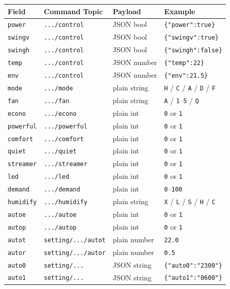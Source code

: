 \documentclass[11pt,a4paper]{article}
\newcommand{\topic}[1]{\texttt{\color{accent}#1}}
\newcommand{\field}[1]{\texttt{\color{codegreen}#1}}
\begin{document}
\begin{longtable}{@{}llll@{}}
\toprule
\textbf{Field} & \textbf{Command Topic} & \textbf{Payload} & \textbf{Example} \\
\midrule
\endhead
\rowcolor{lightbg}
\field{power}    & \topic{.../control}  & JSON bool   & \texttt{\{"power":true\}} \\
\field{swingv}   & \topic{.../control}  & JSON bool   & \texttt{\{"swingv":true\}} \\
\rowcolor{lightbg}
\field{swingh}   & \topic{.../control}  & JSON bool   & \texttt{\{"swingh":false\}} \\
\field{temp}     & \topic{.../control}  & JSON number & \texttt{\{"temp":22\}} \\
\rowcolor{lightbg}
\field{env}      & \topic{.../control}  & JSON number & \texttt{\{"env":21.5\}} \\
\field{mode}     & \topic{.../mode}     & plain string & \texttt{H} / \texttt{C} / \texttt{A} / \texttt{D} / \texttt{F} \\
\rowcolor{lightbg}
\field{fan}      & \topic{.../fan}      & plain string & \texttt{A} / \texttt{1}–\texttt{5} / \texttt{Q} \\
\field{econo}    & \topic{.../econo}    & plain int   & \texttt{0} or \texttt{1} \\
\rowcolor{lightbg}
\field{powerful} & \topic{.../powerful} & plain int   & \texttt{0} or \texttt{1} \\
\field{comfort}  & \topic{.../comfort}  & plain int   & \texttt{0} or \texttt{1} \\
\rowcolor{lightbg}
\field{quiet}    & \topic{.../quiet}    & plain int   & \texttt{0} or \texttt{1} \\
\field{streamer} & \topic{.../streamer} & plain int   & \texttt{0} or \texttt{1} \\
\rowcolor{lightbg}
\field{led}      & \topic{.../led}      & plain int   & \texttt{0} or \texttt{1} \\
\field{demand}   & \topic{.../demand}   & plain int   & \texttt{0}–\texttt{100} \\
\rowcolor{lightbg}
\field{humidify} & \topic{.../humidify} & plain string & \texttt{X} / \texttt{L} / \texttt{S} / \texttt{H} / \texttt{C} \\
\field{autoe}    & \topic{.../autoe}    & plain int   & \texttt{0} or \texttt{1} \\
\rowcolor{lightbg}
\field{autop}    & \topic{.../autop}    & plain int   & \texttt{0} or \texttt{1} \\
\field{autot}    & \topic{setting/.../autot} & plain number & \texttt{22.0} \\
\rowcolor{lightbg}
\field{autor}    & \topic{setting/.../autor} & plain number & \texttt{0.5} \\
\field{auto0}    & \topic{setting/...}  & JSON string & \texttt{\{"auto0":"2300"\}} \\
\rowcolor{lightbg}
\field{auto1}    & \topic{setting/...}  & JSON string & \texttt{\{"auto1":"0600"\}} \\
\bottomrule
\end{longtable}
\end{document}
